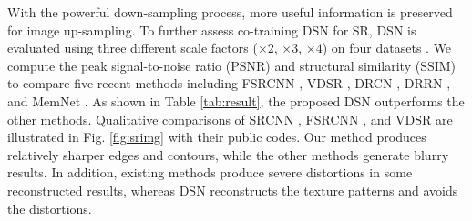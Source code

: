 \documentclass[runningheads]{llncs}
\begin{document}
With the powerful down-sampling process, more useful information is preserved for image up-sampling. To further assess co-training DSN for SR, DSN is evaluated using three different scale factors ($\times 2$, $\times3$, $\times4$) on four datasets \cite{set5,set14,b100,selfex}. We compute the peak signal-to-noise ratio (PSNR) and structural similarity (SSIM) to compare five recent methods including FSRCNN \cite{fsrcnn}, VDSR \cite{vdsr}, DRCN \cite{drcn}, DRRN \cite{drrn}, and MemNet \cite{memnet}. As shown in Table \ref{tab:result}, the proposed DSN outperforms the other methods. Qualitative comparisons of SRCNN \cite{srcnn_pami}, FSRCNN \cite{fsrcnn}, and VDSR \cite{vdsr} are illustrated in Fig. \ref{fig:srimg} with their public codes. Our method produces relatively sharper edges and contours, while the other methods generate blurry results. In addition, existing methods produce severe distortions in some reconstructed results, whereas DSN reconstructs the texture patterns and avoids the distortions.
\end{document}
